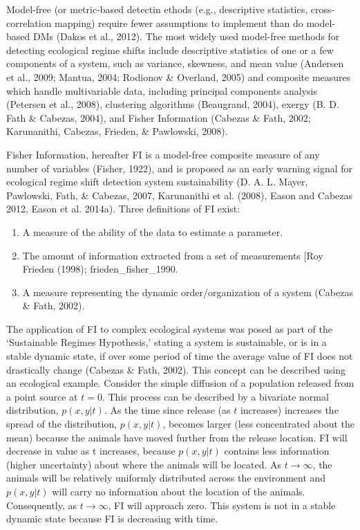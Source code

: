 \documentclass[12pt,twoside]{reedthesis}
\providecommand{\tightlist}{%
  \setlength{\itemsep}{0pt}\setlength{\parskip}{0pt}}
\def\labelenumi{\arabic{enumi}.}
\def\labelenumi{\arabic{enumi}.}
\begin{document}
Model-free (or metric-based detectin ethods (e.g., descriptive
statistics, cross-correlation mapping) require fewer assumptions to
implement than do model-based DMs (Dakos et al., 2012). The most widely
used model-free methods for detecting ecological regime shifts include
descriptive statistics of one or a few components of a system, such as
variance, skewness, and mean value (Andersen et al., 2009; Mantua, 2004;
Rodionov \& Overland, 2005) and composite measures which handle
multivariable data, including principal components analysis (Petersen et
al., 2008), clustering algorithms (Beaugrand, 2004), exergy (B. D. Fath
\& Cabezas, 2004), and Fisher Information (Cabezas \& Fath, 2002;
Karunanithi, Cabezas, Frieden, \& Pawlowski, 2008).

Fisher Information, hereafter FI is a model-free composite measure of
any number of variables (Fisher, 1922), and is proposed as an early
warning signal for ecological regime shift detection system
sustainability (D. A. L. Mayer, Pawlowski, Fath, \& Cabezas, 2007,
Karunanithi et al. (2008), Eason and Cabezas 2012, Eason et al. 2014a).
Three definitions of FI exist:
\begin{enumerate}
\def\labelenumi{\Roman{enumi}.}
\tightlist
\item
  A measure of the ability of the data to estimate a parameter.\\
\item
  The amount of information extracted from a set of measurements {[}Roy
  Frieden (1998); frieden\_fisher\_1990\protect\hyperlink{section}{}.\\
\item
  A measure representing the dynamic order/organization of a system
  (Cabezas \& Fath, 2002).
\end{enumerate}
The application of FI to complex ecological systems was posed as part of
the `Sustainable Regimes Hypothesis,' stating a system is sustainable,
or is in a stable dynamic state, if over some period of time the average
value of FI does not drastically change (Cabezas \& Fath, 2002). This
concept can be described using an ecological example. Consider the
simple diffusion of a population released from a point source at
\(t = 0\). This process can be described by a bivariate normal
distribution, \(p(x,y\vert t)\). As the time since release (as \(t\)
increases) increases the spread of the distribution, \(p(x,y\vert t)\),
becomes larger (less concentrated about the mean) because the animals
have moved further from the release location. FI will decrease in value
as t increases, because \(p(x,y\vert t)\) contains less information
(higher uncertainty) about where the animals will be located. As
\(t→\infty\), the animals will be relatively uniformly distributed
across the environment and \(p(x,y\vert t)\) will carry no information
about the location of the animals. Consequently, as \(t→\infty\), FI
will approach zero. This system is not in a stable dynamic state because
FI is decreasing with time.
\end{document}
